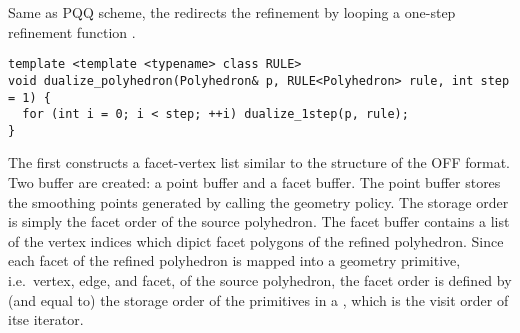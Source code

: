 Same as PQQ scheme, the 
redirects the refinement by looping a one-step
refinement function .
\begin{lstlisting}
template <template <typename> class RULE>
void dualize_polyhedron(Polyhedron& p, RULE<Polyhedron> rule, int step = 1) {
  for (int i = 0; i < step; ++i) dualize_1step(p, rule);
}
\end{lstlisting}
The  first constructs a facet-vertex list
similar to the structure of the OFF format. Two buffer are created:
a point buffer and a facet buffer. The point buffer stores the
smoothing points generated by calling the geometry policy.
The storage order is simply the facet order of the source polyhedron.
The facet buffer contains a list of the vertex indices which dipict
facet polygons of the refined polyhedron. Since each facet of the 
refined polyhedron is mapped into a geometry primitive, 
i.e.\ vertex, edge, and facet, of the source polyhedron, the facet
order is defined by (and equal to) the storage order of the 
primitives in a \cgalpoly , which is the visit order of itse
iterator.   
